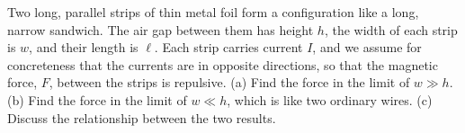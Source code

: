         Two long, parallel strips of thin metal foil form a configuration like a long,
        narrow sandwich. The air gap between them has height $h$, the width of each
        strip is $w$, and their length is $\ell$. 
        Each strip carries current $I$, and we assume for concreteness that
        the currents are in opposite directions, so that the magnetic force, $F$, between
        the strips is repulsive.\hwendpart
        (a) Find the force in the limit of $w\gg h$.\answercheck\hwendpart
        (b) Find the force in the limit of $w\ll h$, which is like two ordinary wires.\hwendpart
        (c) Discuss the relationship between the two results.
